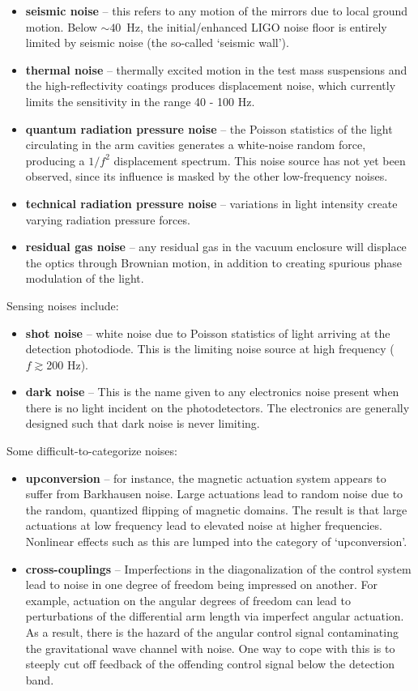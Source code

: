 \begin{itemize}
\item \textbf{seismic noise} -- this refers to any motion of the mirrors due to
  local ground motion.  Below $\sim40$~Hz, the initial/enhanced LIGO
  noise floor is entirely limited by seismic noise (the so-called `seismic wall').
\item \textbf{thermal noise} -- thermally excited motion in the test mass
  suspensions and the high-reflectivity coatings produces displacement noise\cite{Saulson1990Thermal,Gonzalez1994Brownian},
  which currently limits the sensitivity in the range 40 - 100 Hz.
\item \textbf{quantum radiation pressure noise} -- the Poisson statistics of
  the light circulating in the arm cavities generates a white-noise
  random force, producing a $1/f^2$ displacement spectrum.  This noise
  source has not yet been observed, since its influence is masked by
  the other low-frequency noises.
\item \textbf{technical radiation pressure noise} -- variations in
  light intensity create varying radiation pressure forces.
\item \textbf{residual gas noise} -- any residual gas in the vacuum
  enclosure will displace the optics through Brownian motion, in addition to
  creating spurious phase modulation of the light.

\end{itemize}
Sensing noises include:
\begin{itemize}
\item \textbf{shot noise} -- white noise due to Poisson statistics of
  light arriving at the detection photodiode.  This is the limiting
  noise source at high frequency ($f\gtrsim$200 Hz).
\item \textbf{dark noise} -- This is the name given to any electronics
  noise present when there is no light incident on the photodetectors.
  The electronics are generally designed such that dark noise is never
  limiting.
\end{itemize}
Some difficult-to-categorize noises:
\begin{itemize}
\item \textbf{upconversion} -- for instance, the magnetic actuation
  system appears to suffer from Barkhausen noise.  Large actuations
  lead to random noise due to the random, quantized flipping of
  magnetic domains. The result is that large actuations at low
  frequency lead to elevated noise at higher frequencies.  Nonlinear
  effects such as this are lumped into the category of `upconversion'.
\item \textbf{cross-couplings} -- Imperfections in the diagonalization
  of the control system lead to noise in one degree of freedom being
  impressed on another.  For example, actuation on the angular degrees
  of freedom can lead to perturbations of the differential arm length
  via imperfect angular actuation.  As a result, there is the hazard
  of the angular control signal contaminating the gravitational wave
  channel with noise.  One way to cope with this is to steeply cut off
  feedback of the offending control signal below the detection band.
\end{itemize}

